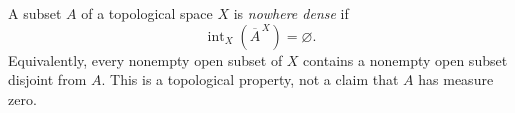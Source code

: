 
A subset $A$ of a topological space $X$ is \emph{nowhere dense} if
\[
\operatorname{int}_X(\overline A^{\,X})=\varnothing.
\]
Equivalently, every nonempty open subset of $X$ contains a nonempty open subset disjoint from $A$. This is a topological property, not a claim that $A$ has measure zero.
